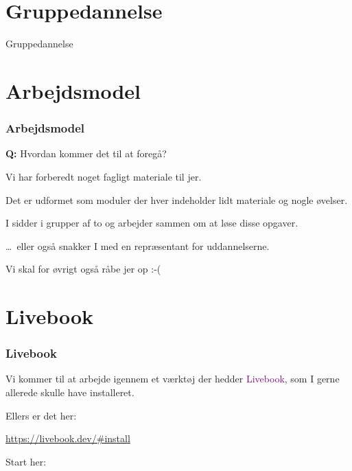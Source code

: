 \section{Gruppedannelse}
\begin{frame}
  \vspace{32mm}
  \begin{center}
    \Huge{Gruppedannelse}
  \end{center}
\end{frame}

\section{Arbejdsmodel}
\begin{frame}
  \frametitle{Arbejdsmodel}
  \vspace{3mm}
  \textbf{Q:} Hvordan kommer det til at foregå?
  
  \pause
  \vspace{5mm}
  Vi har forberedt noget fagligt materiale til jer.
  
  \vspace{5mm}
  Det er udformet som moduler der hver indeholder lidt materiale og nogle øvelser.
  
  \vspace{5mm}
  I sidder i grupper af to og arbejder sammen om at løse disse opgaver.
  
  \pause
  \vspace{5mm}
  \ldots\ eller også snakker I med en repræsentant for uddannelserne.
  
  \pause
  \vspace{5mm}
  Vi skal for øvrigt også råbe jer op :-(
\end{frame}

\section{Livebook}
\begin{frame}
    \frametitle{Livebook}
    \vspace{5mm}
    Vi kommer til at arbejde igennem et værktøj der hedder \textcolor{purple}{Livebook}, som I gerne allerede skulle have installeret.
    
    \vspace{7mm}
    Ellers er det her:
    \begin{center}
      \url{https://livebook.dev/\#install}
    \end{center}
    
    \vspace{7mm}
    Start her:
    \begin{center}
    \end{center}
\end{frame}

